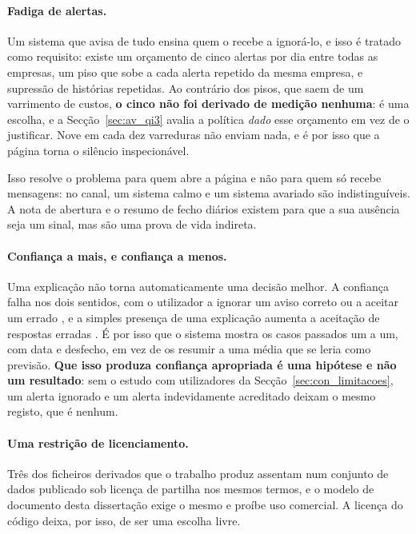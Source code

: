\paragraph{Fadiga de alertas.} Um sistema que avisa de tudo ensina quem o recebe a ignorá-lo, e
isso é tratado como requisito: existe um orçamento de cinco alertas por dia entre todas as
empresas, um piso que sobe a cada alerta repetido da mesma empresa, e supressão de histórias
repetidas. Ao contrário dos pisos, que saem de um varrimento de custos, \textbf{o cinco não foi
derivado de medição nenhuma}: é uma escolha, e a Secção~\ref{sec:av_qi3} avalia a política
\emph{dado} esse orçamento em vez de o justificar. Nove em cada dez varreduras não enviam nada, e é
por isso que a página torna o silêncio inspecionável.

Isso resolve o problema para quem abre a página e não para quem só recebe mensagens: no canal, um
sistema calmo e um sistema avariado são indistinguíveis. A nota de abertura e o resumo de fecho
diários existem para que a sua ausência seja um sinal, mas são uma prova de vida indireta.

\paragraph{Confiança a mais, e confiança a menos.} Uma explicação não torna automaticamente uma
decisão melhor. A confiança falha nos dois sentidos, com o utilizador a ignorar um aviso correto ou
a aceitar um errado \autocite{lee2004trust}, e a simples presença de uma explicação aumenta a
aceitação de respostas erradas \autocite{bansal2021whole}. É por isso que o sistema mostra os casos
passados um a um, com data e desfecho, em vez de os resumir a uma média que se leria como previsão.
\textbf{Que isso produza confiança apropriada é uma hipótese e não um resultado}: sem o estudo com
utilizadores da Secção~\ref{sec:con_limitacoes}, um alerta ignorado e um alerta indevidamente
acreditado deixam o mesmo registo, que é nenhum.

\paragraph{Uma restrição de licenciamento.} Três dos ficheiros derivados que o trabalho produz
assentam num conjunto de dados publicado sob licença de partilha nos mesmos termos, e o modelo de
documento desta dissertação exige o mesmo e proíbe uso comercial. A licença do código deixa, por
isso, de ser uma escolha livre.

